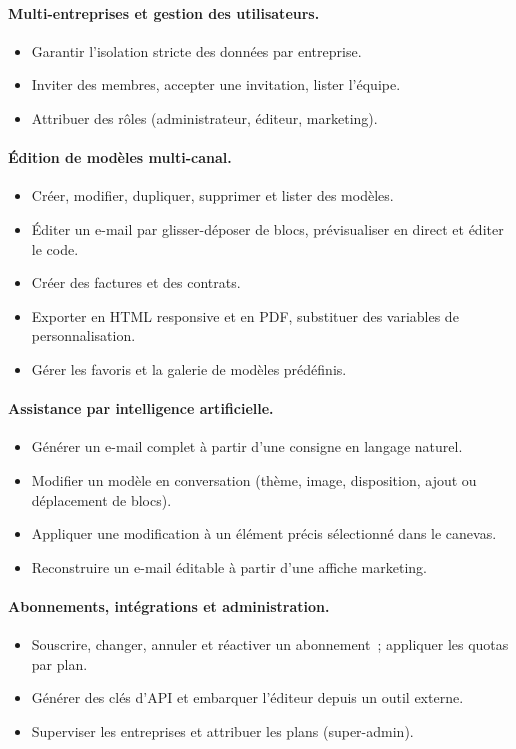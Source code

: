 \documentclass[12pt,a4paper,oneside]{report}
\begin{document}
\paragraph{Multi-entreprises et gestion des utilisateurs.}
\begin{itemize}[leftmargin=1.4cm,nosep]
  \item Garantir l'isolation stricte des données par entreprise.
  \item Inviter des membres, accepter une invitation, lister l'équipe.
  \item Attribuer des rôles (administrateur, éditeur, marketing).
\end{itemize}

\paragraph{Édition de modèles multi-canal.}
\begin{itemize}[leftmargin=1.4cm,nosep]
  \item Créer, modifier, dupliquer, supprimer et lister des modèles.
  \item Éditer un e-mail par glisser-déposer de blocs, prévisualiser en
  direct et éditer le code.
  \item Créer des factures et des contrats.
  \item Exporter en HTML responsive et en PDF, substituer des variables de
  personnalisation.
  \item Gérer les favoris et la galerie de modèles prédéfinis.
\end{itemize}

\paragraph{Assistance par intelligence artificielle.}
\begin{itemize}[leftmargin=1.4cm,nosep]
  \item Générer un e-mail complet à partir d'une consigne en langage
  naturel.
  \item Modifier un modèle en conversation (thème, image, disposition,
  ajout ou déplacement de blocs).
  \item Appliquer une modification à un élément précis sélectionné dans le
  canevas.
  \item Reconstruire un e-mail éditable à partir d'une affiche marketing.
\end{itemize}

\paragraph{Abonnements, intégrations et administration.}
\begin{itemize}[leftmargin=1.4cm,nosep]
  \item Souscrire, changer, annuler et réactiver un abonnement~; appliquer
  les quotas par plan.
  \item Générer des clés d'API et embarquer l'éditeur depuis un outil
  externe.
  \item Superviser les entreprises et attribuer les plans (super-admin).
\end{itemize}
\end{document}
